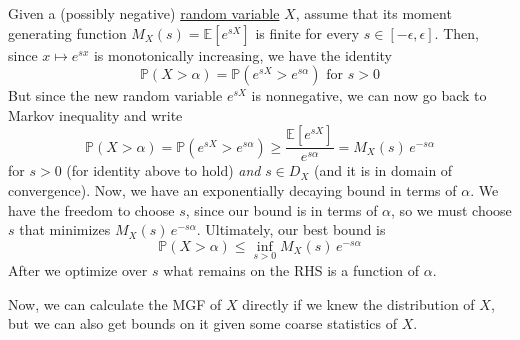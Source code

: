     \begin{theorem}
      \label{thm:chernoff-bound}
      Given a (possibly negative) \hyperref[def:random-variable]{random variable} $X$, assume that its moment generating function $M_X (s) = \mathbb{E}[e^{s X}]$ is finite for every $s \in [-\epsilon, \epsilon]$. Then, since $x \mapsto e^{s x}$ is monotonically increasing, we have the identity 
      \begin{equation}
        \mathbb{P}(X > \alpha) = \mathbb{P}(e^{s X} > e^{s \alpha}) \text{ for } s > 0
      \end{equation}
      But since the new random variable $e^{s X}$ is nonnegative, we can now go back to Markov inequality and write 
      \begin{equation}
        \mathbb{P}(X > \alpha) = \mathbb{P}(e^{s X} > e^{s \alpha}) \geq \frac{\mathbb{E}[e^{s X}]}{e^{s \alpha}} = M_X (s) \, e^{-s \alpha}
      \end{equation}
      for $s > 0$ (for identity above to hold) \textit{and} $s \in D_X$ (and it is in domain of convergence). Now, we have an exponentially decaying bound in terms of $\alpha$. We have the freedom to choose $s$, since our bound is in terms of $\alpha$, so we must choose $s$ that minimizes $M_X (s) \, e^{-s \alpha}$. Ultimately, our best bound is 
      \begin{equation}
        \mathbb{P}(X > \alpha) \leq \inf_{s > 0} M_X (s) \, e^{-s \alpha}
      \end{equation}
      After we optimize over $s$ what remains on the RHS is a function of $\alpha$. 
    \end{theorem}

    Now, we can calculate the MGF of $X$ directly if we knew the distribution of $X$, but we can also get bounds on it given some coarse statistics of $X$. 

